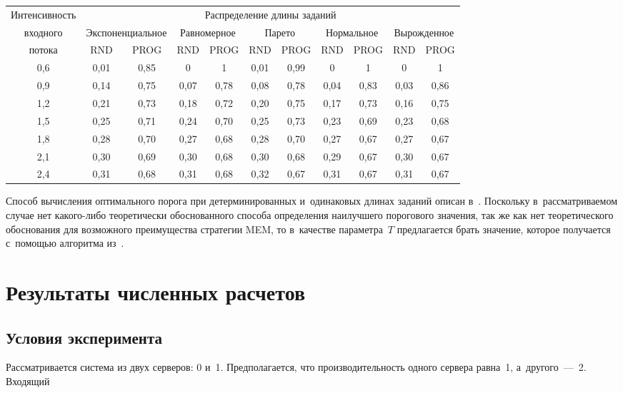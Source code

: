 \begin{multicols}{2}
\begin{table*}
\begin{center}
\begin{tabular}{|c|c|c|c|c|c|c|c|c|c|c|}
\hline
Интенсивность &\multicolumn{10}{c}{Распределение длины заданий}\\
\cline{2-11}
входного &\multicolumn{2}{c|}{Экспоненциальное}&
\multicolumn{2}{c|}{Равномерное}&
\multicolumn{2}{c|}{Парето}&\multicolumn{2}{c|}{Нормальное}&
\multicolumn{2}{c|}{Вырожденное}\\
\cline{2-11}
потока&RND&PROG&RND&PROG&RND&PROG&RND&PROG&RND&PROG\\
\hline
0,6&0,01&0,85&0&1&0,01&0,99&0&1&0&1\\
0,9&0,14&0,75&0,07&0,78&0,08&0,78&0,04&0,83&0,03&0,86\\
1,2&0,21&0,73&0,18&0,72&0,20&0,75&0,17&0,73&0,16&0,75\\
1,5&0,25&0,71&0,24&0,70&0,25&0,73&0,23&0,69&0,23&0,68\\
1,8&0,28&0,70&0,27&0,68&0,28&0,70&0,27&0,67&0,27&0,67\\
2,1&0,30&0,69&0,30&0,68&0,30&0,68&0,29&0,67&0,30&0,67\\
2,4&0,31&0,68&0,31&0,68&0,32&0,67&0,31&0,67&0,31&0,67\\
    \hline
    \end{tabular}
    \end{center}
    \end{table*}
    
    
    Способ вычисления оптимального порога при детерминированных и~одинаковых 
длинах заданий описан в~\cite{23-kon}. Поскольку в~рассматриваемом случае нет 
 ка\-ко\-го-ли\-бо теоретически обоснованного способа определения наилучшего 
порогового значения, так же как нет теоретического обоснования для возможного 
преимущества стратегии MEM, то в~качестве параметра~$T$ предлагается брать значение, 
которое получается с~помощью алгоритма из~\cite{23-kon}.

\vspace*{-6pt}

\section{Результаты численных расчетов}

\vspace*{-3pt}

\subsection{Условия эксперимента}

    Рассматривается система из двух серверов: 0 и~1. Предполагается, что 
производительность одного сервера равна~1, а~другого~---~2. Входящий\linebreak\vspace*{-12pt}


\end{multicols}
